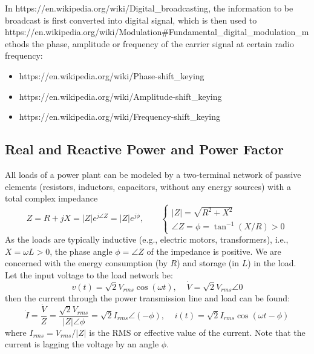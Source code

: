 \documentclass{article}
\begin{document}
In 
{https://en.wikipedia.org/wiki/Digital_broadcasting},
the information to be broadcast is first converted into digital signal,
which is then used to 
{https://en.wikipedia.org/wiki/Modulation#Fundamental_digital_modulation_methods}
the phase, amplitude or frequency of the carrier signal at certain radio 
frequency:
\begin{itemize}
\item {}
  {https://en.wikipedia.org/wiki/Phase-shift_keying}
\item {}
  {https://en.wikipedia.org/wiki/Amplitude-shift_keying}
\item {}
  {https://en.wikipedia.org/wiki/Frequency-shift_keying}
\end{itemize}


\subsection*{Real and Reactive Power and Power Factor}


All loads of a power plant can be modeled by a two-terminal network of
passive elements (resistors, inductors, capacitors, without any energy 
sources) with a total complex impedance 
\begin{equation}
  Z=R+jX=|Z|e^{j\angle Z}=|Z|e^{j\phi},\;\;\;\;\;\;\;
  \left\{\begin{array}{ll}|Z|=\sqrt{R^2+X^2}\\\angle Z=\phi=\tan^{-1}(X/R)>0
  \end{array}\right.
\end{equation}
As the loads are typically inductive (e.g., electric motors, transformers), 
i.e., $X=\omega L>0$, the phase angle $\phi=\angle Z$ of the impedance is 
positive. We are concerned with the energy consumption (by $R$) and 
storage (in $L$) in the load. Let the input voltage to the load network 
be:
\begin{equation}
  v(t)=\sqrt{2}V_{rms} \cos(\omega t),\;\;\;\;\dot{V}=\sqrt{2}V_{rms}\angle 0 
\end{equation}
then the current through the power transmission line and load can be found:
\begin{equation}
  \dot{I}=\frac{\dot{V}}{Z}=\frac{\sqrt{2}V_{rms}}{|Z|\angle \phi}
  =\sqrt{2}I_{rms}\angle(-\phi),\;\;\;\;i(t)=\sqrt{2}I_{rms} \cos(\omega t-\phi)  
\end{equation}
where $I_{rms}=V_{rms}/|Z|$ is the RMS or effective value of the current.
Note that the current is lagging the voltage by an angle $\phi$.
\end{document}

